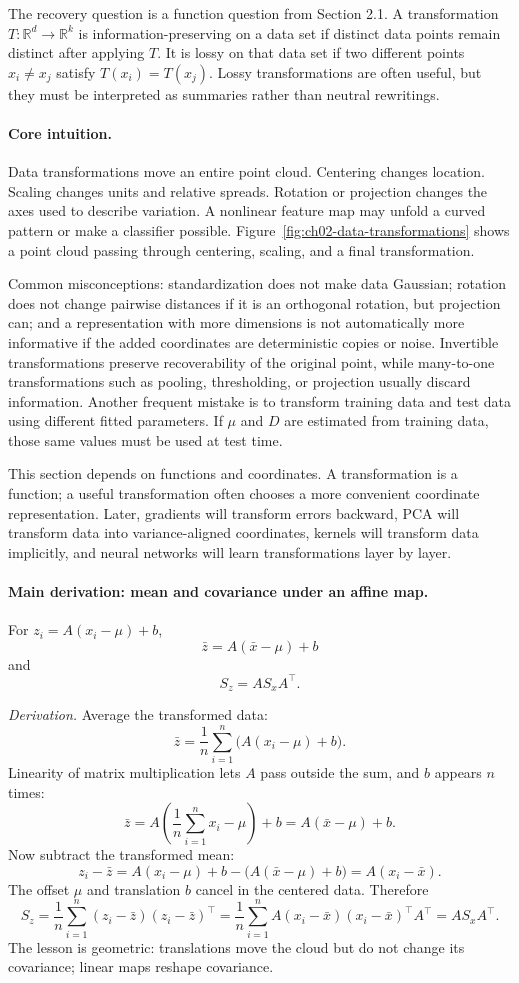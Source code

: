 The recovery question is a function question from Section 2.1. A transformation \(T:\mathbb{R}^d\to\mathbb{R}^k\) is information-preserving on a data set if distinct data points remain distinct after applying \(T\). It is lossy on that data set if two different points \(x_i\ne x_j\) satisfy \(T(x_i)=T(x_j)\). Lossy transformations are often useful, but they must be interpreted as summaries rather than neutral rewritings.

\paragraph{Core intuition.}
Data transformations move an entire point cloud. Centering changes location. Scaling changes units and relative spreads. Rotation or projection changes the axes used to describe variation. A nonlinear feature map may unfold a curved pattern or make a classifier possible. Figure~\ref{fig:ch02-data-transformations} shows a point cloud passing through centering, scaling, and a final transformation.

Common misconceptions: standardization does not make data Gaussian; rotation does not change pairwise distances if it is an orthogonal rotation, but projection can; and a representation with more dimensions is not automatically more informative if the added coordinates are deterministic copies or noise. Invertible transformations preserve recoverability of the original point, while many-to-one transformations such as pooling, thresholding, or projection usually discard information. Another frequent mistake is to transform training data and test data using different fitted parameters. If \(\mu\) and \(D\) are estimated from training data, those same values must be used at test time.

This section depends on functions and coordinates. A transformation is a function; a useful transformation often chooses a more convenient coordinate representation. Later, gradients will transform errors backward, PCA will transform data into variance-aligned coordinates, kernels will transform data implicitly, and neural networks will learn transformations layer by layer.

\paragraph{Main derivation: mean and covariance under an affine map.}
For \(z_i=A(x_i-\mu)+b\),
\[
\bar z=A(\bar x-\mu)+b
\]
and
\[
S_z=A S_x A^\top.
\]

\emph{Derivation.} Average the transformed data:
\[
\bar z=\frac{1}{n}\sum_{i=1}^n \bigl(A(x_i-\mu)+b\bigr).
\]
Linearity of matrix multiplication lets \(A\) pass outside the sum, and \(b\) appears \(n\) times:
\[
\bar z=A\left(\frac{1}{n}\sum_{i=1}^n x_i-\mu\right)+b
=A(\bar x-\mu)+b.
\]
Now subtract the transformed mean:
\[
z_i-\bar z
=A(x_i-\mu)+b-\bigl(A(\bar x-\mu)+b\bigr)
=A(x_i-\bar x).
\]
The offset \(\mu\) and translation \(b\) cancel in the centered data. Therefore
\[
S_z=\frac{1}{n}\sum_{i=1}^n (z_i-\bar z)(z_i-\bar z)^\top
=\frac{1}{n}\sum_{i=1}^n A(x_i-\bar x)(x_i-\bar x)^\top A^\top
=A S_x A^\top.
\]
The lesson is geometric: translations move the cloud but do not change its covariance; linear maps reshape covariance.

